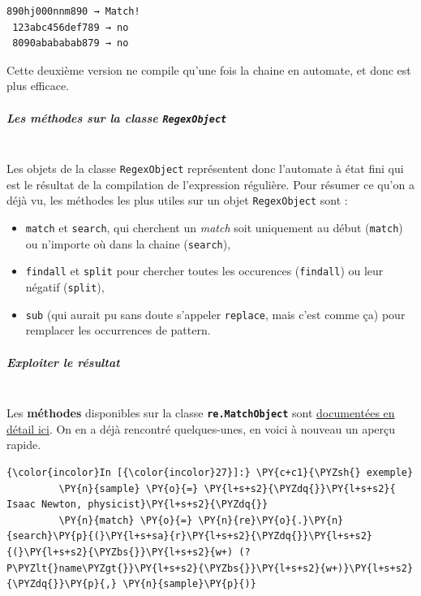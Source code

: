     \begin{Verbatim}[commandchars=\\\{\}]
  890hj000nnm890 → Match!
 123abc456def789 → no
 8090abababab879 → no

    \end{Verbatim}

    Cette deuxième version ne compile qu'une fois la chaine en automate, et
donc est plus efficace.

    \hypertarget{les-muxe9thodes-sur-la-classe-regexobject}{%
\subparagraph{\texorpdfstring{Les méthodes sur la classe
\texttt{RegexObject}}{Les méthodes sur la classe RegexObject}\\\\}\label{les-muxe9thodes-sur-la-classe-regexobject}}

    Les objets de la classe \texttt{RegexObject} représentent donc
l'automate à état fini qui est le résultat de la compilation de
l'expression régulière. Pour résumer ce qu'on a déjà vu, les méthodes
les plus utiles sur un objet \texttt{RegexObject} sont :

\begin{itemize}
	\item 
	\texttt{match} et \texttt{search}, qui cherchent un \emph{match} soit
	uniquement au début (\texttt{match}) ou n'importe où dans la chaine
	(\texttt{search}),
	\item
	\texttt{findall} et \texttt{split} pour chercher
	toutes les occurences (\texttt{findall}) ou leur négatif
	(\texttt{split}),
	\item
	\texttt{sub} (qui aurait pu sans doute s'appeler
	\texttt{replace}, mais c'est comme ça) pour remplacer les occurrences de
	pattern.
\end{itemize}

    \hypertarget{exploiter-le-ruxe9sultat}{%
\subparagraph{Exploiter le résultat\\\\}\label{exploiter-le-ruxe9sultat}}

    Les \textbf{méthodes} disponibles sur la classe
\textbf{\texttt{re.MatchObject}} sont
\href{https://docs.python.org/3/library/re.html\#match-objects}{documentées
en détail ici}. On en a déjà rencontré quelques-unes, en voici à nouveau
un aperçu rapide.

    \begin{Verbatim}[commandchars=\\\{\}]
{\color{incolor}In [{\color{incolor}27}]:} \PY{c+c1}{\PYZsh{} exemple}
         \PY{n}{sample} \PY{o}{=} \PY{l+s+s2}{\PYZdq{}}\PY{l+s+s2}{    Isaac Newton, physicist}\PY{l+s+s2}{\PYZdq{}}
         \PY{n}{match} \PY{o}{=} \PY{n}{re}\PY{o}{.}\PY{n}{search}\PY{p}{(}\PY{l+s+sa}{r}\PY{l+s+s2}{\PYZdq{}}\PY{l+s+s2}{(}\PY{l+s+s2}{\PYZbs{}}\PY{l+s+s2}{w+) (?P\PYZlt{}name\PYZgt{}}\PY{l+s+s2}{\PYZbs{}}\PY{l+s+s2}{w+)}\PY{l+s+s2}{\PYZdq{}}\PY{p}{,} \PY{n}{sample}\PY{p}{)}
\end{Verbatim}


